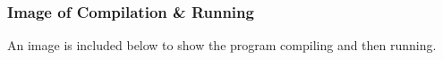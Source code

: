 \documentclass[a4paper, 11pt]{article}
\begin{document}
      \subsubsection{Image of Compilation \& Running}
        An image is included below to show the program compiling and then
          running.

  \newpage
  \printbibliography[%
    heading=bibintoc,%
    title={Works Consulted}%
  ]
\end{document}

